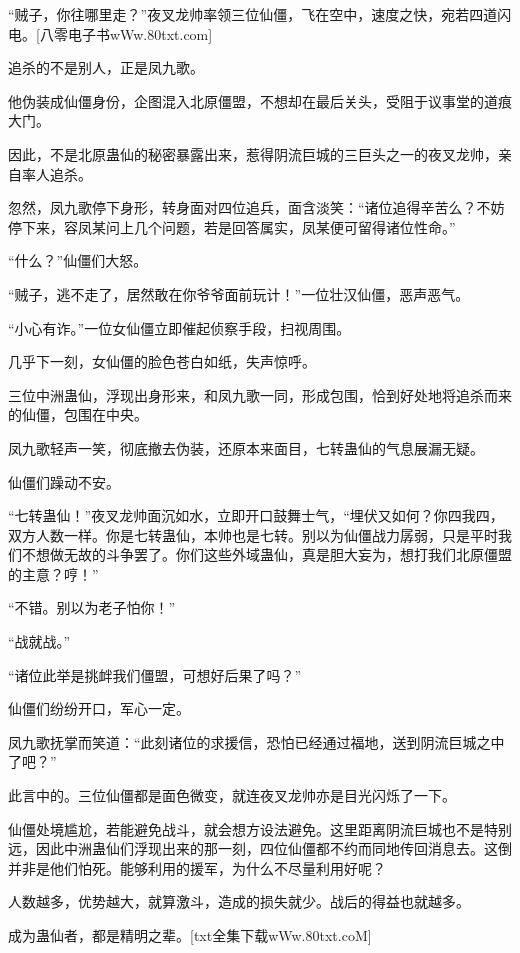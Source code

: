 
\begin{this_body}

“贼子，你往哪里走？”夜叉龙帅率领三位仙僵，飞在空中，速度之快，宛若四道闪电。[八零电子书wWw.80txt.com]

追杀的不是别人，正是凤九歌。

他伪装成仙僵身份，企图混入北原僵盟，不想却在最后关头，受阻于议事堂的道痕大门。

因此，不是北原蛊仙的秘密暴露出来，惹得阴流巨城的三巨头之一的夜叉龙帅，亲自率人追杀。

忽然，凤九歌停下身形，转身面对四位追兵，面含淡笑：“诸位追得辛苦么？不妨停下来，容凤某问上几个问题，若是回答属实，凤某便可留得诸位性命。”

“什么？”仙僵们大怒。

“贼子，逃不走了，居然敢在你爷爷面前玩计！”一位壮汉仙僵，恶声恶气。

“小心有诈。”一位女仙僵立即催起侦察手段，扫视周围。

几乎下一刻，女仙僵的脸色苍白如纸，失声惊呼。

三位中洲蛊仙，浮现出身形来，和凤九歌一同，形成包围，恰到好处地将追杀而来的仙僵，包围在中央。

凤九歌轻声一笑，彻底撤去伪装，还原本来面目，七转蛊仙的气息展漏无疑。

仙僵们躁动不安。

“七转蛊仙！”夜叉龙帅面沉如水，立即开口鼓舞士气，“埋伏又如何？你四我四，双方人数一样。你是七转蛊仙，本帅也是七转。别以为仙僵战力孱弱，只是平时我们不想做无故的斗争罢了。你们这些外域蛊仙，真是胆大妄为，想打我们北原僵盟的主意？哼！”

“不错。别以为老子怕你！”

“战就战。”

“诸位此举是挑衅我们僵盟，可想好后果了吗？”

仙僵们纷纷开口，军心一定。

凤九歌抚掌而笑道：“此刻诸位的求援信，恐怕已经通过福地，送到阴流巨城之中了吧？”

此言中的。三位仙僵都是面色微变，就连夜叉龙帅亦是目光闪烁了一下。

仙僵处境尴尬，若能避免战斗，就会想方设法避免。这里距离阴流巨城也不是特别远，因此中洲蛊仙们浮现出来的那一刻，四位仙僵都不约而同地传回消息去。这倒并非是他们怕死。能够利用的援军，为什么不尽量利用好呢？

人数越多，优势越大，就算激斗，造成的损失就少。战后的得益也就越多。

成为蛊仙者，都是精明之辈。[txt全集下载wWw.80txt.coM]


\end{this_body}
